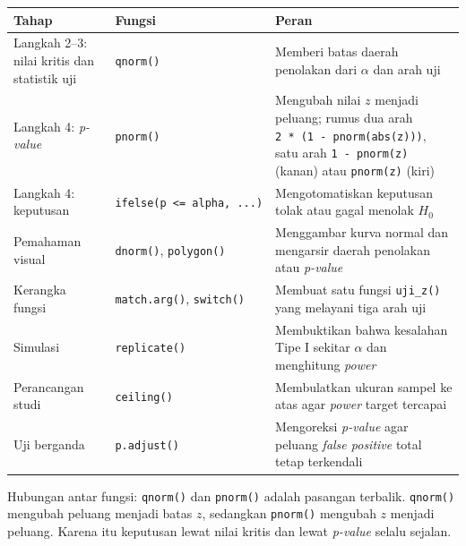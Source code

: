 \documentclass[
  indonesian,
  letterpaper,
]{book}
\newcounter{none} %
\begin{document}
{\def\LTcaptype{none} %
\begin{longtable}[]{@{}
  >{\raggedright\arraybackslash}p{}
  >{\raggedright\arraybackslash}p{}
  >{\raggedright\arraybackslash}p{}@{}}
\toprule\noalign{}
\begin{minipage}[b]{\linewidth}\raggedright
Tahap
\end{minipage} & \begin{minipage}[b]{\linewidth}\raggedright
Fungsi
\end{minipage} & \begin{minipage}[b]{\linewidth}\raggedright
Peran
\end{minipage} \\
\midrule\noalign{}
\endhead
\bottomrule\noalign{}
\endlastfoot
Langkah 2--3: nilai kritis dan statistik uji & \texttt{qnorm()} &
Memberi batas daerah penolakan dari \(\alpha\) dan arah uji \\
Langkah 4: \emph{p-value} & \texttt{pnorm()} & Mengubah nilai \(z\)
menjadi peluang; rumus dua arah \texttt{2\ *\ (1\ -\ pnorm(abs(z)))},
satu arah \texttt{1\ -\ pnorm(z)} (kanan) atau \texttt{pnorm(z)}
(kiri) \\
Langkah 4: keputusan & \texttt{ifelse(p\ \textless{}=\ alpha,\ ...)} &
Mengotomatiskan keputusan tolak atau gagal menolak \(H_0\) \\
Pemahaman visual & \texttt{dnorm()}, \texttt{polygon()} & Menggambar
kurva normal dan mengarsir daerah penolakan atau \emph{p-value} \\
Kerangka fungsi & \texttt{match.arg()}, \texttt{switch()} & Membuat satu
fungsi \texttt{uji\_z()} yang melayani tiga arah uji \\
Simulasi & \texttt{replicate()} & Membuktikan bahwa kesalahan Tipe I
sekitar \(\alpha\) dan menghitung \emph{power} \\
Perancangan studi & \texttt{ceiling()} & Membulatkan ukuran sampel ke
atas agar \emph{power} target tercapai \\
Uji berganda & \texttt{p.adjust()} & Mengoreksi \emph{p-value} agar
peluang \emph{false positive} total tetap terkendali \\
\end{longtable}
}

Hubungan antar fungsi: \texttt{qnorm()} dan \texttt{pnorm()} adalah
pasangan terbalik. \texttt{qnorm()} mengubah peluang menjadi batas
\(z\), sedangkan \texttt{pnorm()} mengubah \(z\) menjadi peluang. Karena
itu keputusan lewat nilai kritis dan lewat \emph{p-value} selalu
sejalan.
\end{document}
